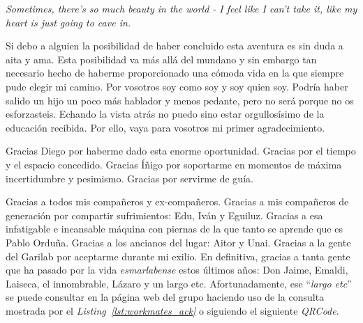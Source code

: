



\begin{acknowledgements}      

\begin{flushright}
\emph{Sometimes, there's so much beauty in the world - I feel like I can't take it, like my heart is just going to cave in.}
\end{flushright}

\bigskip

Si debo a alguien la posibilidad de haber concluido esta aventura es sin duda a aita y ama.
Esta posibilidad va más allá del mundano y sin embargo tan necesario hecho de haberme proporcionado una cómoda vida en la que siempre pude elegir mi camino.
Por vosotros soy como soy y soy quien soy.
Podría haber salido un hijo un poco más hablador y menos pedante, pero no será porque no os esforzasteis.
Echando la vista atrás no puedo sino estar orgullosísimo de la educación recibida.
Por ello, vaya para vosotros mi primer agradecimiento.


Gracias Diego por haberme dado esta enorme oportunidad.
Gracias por el tiempo y el espacio concedido.
Gracias Íñigo por soportarme en momentos de máxima incertidumbre y pesimismo.
Gracias por servirme de guía.


Gracias a todos mis compañeros y ex-compañeros.
Gracias a mis compañeros de generación por compartir sufrimientos: Edu, Iván y Eguiluz.
Gracias a esa infatigable e incansable máquina con piernas de la que tanto se aprende que es Pablo Orduña.
Gracias a los ancianos del lugar: Aitor y Unai.
Gracias a la gente del Garilab por aceptarme durante mi exilio.
En definitiva, gracias a tanta gente que ha pasado por la vida \emph{esmarlabense} estos últimos años: Don Jaime, Emaldi, Laiseca, el innombrable, Lázaro y un largo etc.
Afortunadamente, ese ``\emph{largo etc}'' se puede consultar en la página web del grupo haciendo uso de la consulta mostrada por el \emph{Listing~\ref{lst:workmates_ack}} o siguiendo el siguiente \emph{QRCode}.




\end{acknowledgements}

